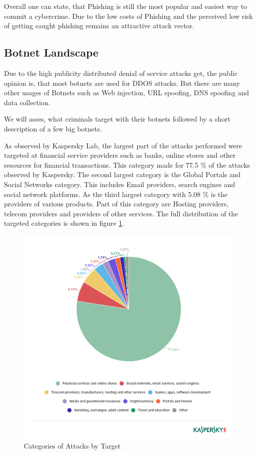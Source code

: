 Overall one can state, that Phishing is still the most popular and easiest way to commit a cybercrime. Due to the low costs of Phishing and the perceived low risk of getting caught phishing remains an attractive attack vector. \cite{McAfee18}

\subsection{Botnet Landscape}

Due to the high publicity distributed denial of service attacks get, the public opinion is, that most botnets are used for DDOS attacks. But there are many other usages of Botnets such as Web injection, URL spoofing, DNS spoofing and data collection. \cite{Eremin19}

We will asses, what criminals target with their botnets followed by a short description of a few big botnets.

 As observed by Kaspersky Lab, the largest part of the attacks performed were targeted at financial service providers such as banks, online stores and other resources for financial transactions. This category made for 77.5 \% of the attacks observed by Kaspersky. The second largest category is the Global Portals and Social Networks category. This includes Email providers, search engines and social network platforms.\cite{Eremin19}
As the third largest category with 5.08 \% is the providers of various products. Part of this category are Hosting providers, telecom providers and providers of other services. 
The full distribution of the targeted categories is shown in figure \ref{fig:KasperskyAttacks}.

\begin{figure}[ht]
\begin{center} \includegraphics[scale=0.5]{Talk11/kasperskyAttacks} \end{center}
\caption{Categories of Attacks by Target \cite{Eremin19}}
\label{fig:KasperskyAttacks}
\end{figure}

